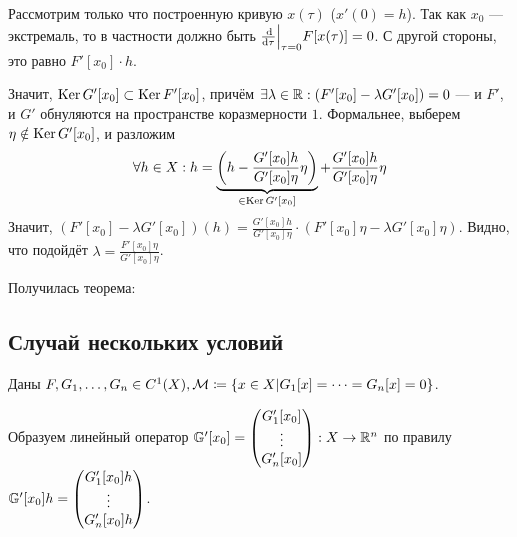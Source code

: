 \documentclass[a4paper]{article}
\begin{document}
    Рассмотрим только что построенную кривую $x(\tau)$ ($x'(0) = h$).
    Так как $x_0$ --- экстремаль, то в частности должно быть $\frac{\operatorname{d}\!}{\operatorname{d}\! \tau}\Big|_{\tau = 0}F[x(\tau)] = 0$.
    С другой стороны, это равно $F'[x_0]\cdot h$.

    Значит, $\operatorname{Ker} G'[x_0] \subset \operatorname{Ker} F'[x_0]$, причём $\exists \lambda \in \mathbb{R}: (F'[x_0] - \lambda G'[x_0]) = 0$ --- и $F'$, и $G'$ обнуляются на пространстве коразмерности $1$.
    Формальнее, выберем $\eta \notin \operatorname{Ker} G'[x_0]$, и разложим \[\forall h \in X: h = \underbrace{\left(h - \frac{G'[x_0]h}{G'[x_0]\eta}\eta\right)}_{\in \operatorname{Ker} G'[x_0]} + \frac{G'[x_0]h}{G'[x_0]\eta}\eta\]
    Значит, $(F'[x_0] - \lambda G'[x_0])(h) = \frac{G'[x_0]h}{G'[x_0]\eta}\cdot (F'[x_0] \eta - \lambda G'[x_0]\eta)$.
    Видно, что подойдёт $\lambda = \frac{F'[x_0]\eta}{G'[x_0]\eta}$.

    Получилась теорема:
    \subsection{Случай нескольких условий}
    Даны $F, G_1, \dots, G_n \in C^1(X), \mathcal{M} \coloneqq \left\{x \in X\middle|G_1[x] = \dots = G_n[x] = 0\right\}$.

    Образуем линейный оператор $\mathbb{G}'[x_0] = \begin{pmatrix}G'_1[x_0] \\ \vdots \\ G'_n[x_0]\end{pmatrix}: X \rightarrow \mathbb{R}^n$ по правилу $\mathbb{G}'[x_0]h = \begin{pmatrix}G'_1[x_0]h \\ \vdots \\ G'_n[x_0]h\end{pmatrix}$.
\end{document}
